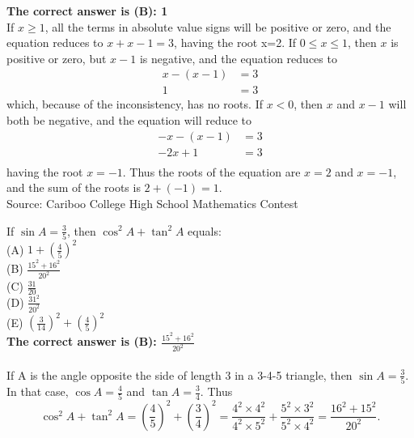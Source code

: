 \documentclass{article}
\begin{document}
\textbf{The correct answer is (B): 1}\\[1 ex]
If $x\geq1$, all the terms in absolute value signs will be positive or zero, and the equation reduces to $x+x-1=3$, having the root x=2. 
If $0\leq x\leq1$, then $x$ is positive or zero, but $x-1$ is negative, and the equation reduces to 
\begin{align*}
x-(x-1)&=3\\
1&=3
\end{align*}
which, because of the inconsistency, has no roots. If $x<0$, then $x$ and $x-1$ will both be negative, and the equation will reduce to 
\begin{align*}
-x-(x-1)&=3\\
-2x+1&=3\\
\end{align*}
having the root $x=-1$.  Thus the roots of the equation are $x=2$ and $x=-1$, and the sum of the roots is $2+(-1)=1$.
\\[5 ex]

\scriptsize
Source: Cariboo College High School Mathematics Contest

\normalsize
If $\sin{A}=\frac{3}{5}$, then $\cos^{2}{A}+\tan^2{A}$ equals:\\
(A) $1+(\frac{4}{5})^2$\\[1 ex]
(B) $\frac{15^{2}+16^{2}}{20^{2}}$\\[1 ex]
(C) $\frac{31}{20}$\\[1 ex]
(D) $\frac{31^2}{20^2}$\\[1 ex]
(E) $(\frac{3}{14})^{2}+(\frac{4}{5})^{2}$\\


\textbf{The correct answer is (B): $\frac{15^{2}+16^{2}}{20^{2}}$\\[1 ex]}\\[1 ex]
If A is the angle opposite the side of length 3 in a 3-4-5 triangle, then $\sin{A}=\frac{3}{5}$. In that case, $\cos{A}=\frac{4}{5}$ and $\tan{A}=\frac{3}{4}$. Thus
\begin{equation*}
\cos^2{A}+\tan^2{A}=(\frac{4}{5})^{2}+(\frac{3}{4})^{2}=\frac{4^2\times4^2}{4^2\times5^2}+\frac{5^2\times3^2}{5^2\times4^2}=\frac{16^{2}+15^{2}}{20^2}.
\end{equation*}
\\[5 ex]
\end{document}
